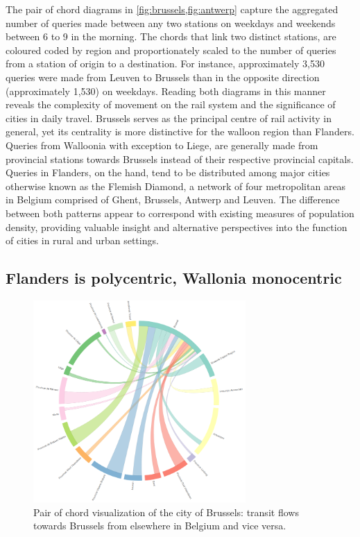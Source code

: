 \documentclass{sig-alternate}
\begin{document}
The pair of chord diagrams in \cref{fig:brussels,fig:antwerp} capture the aggregated number of queries made between any two stations on weekdays and weekends between 6 to 9 in the morning.
The chords that link two distinct stations, are coloured coded by region and proportionately scaled to the number of queries from a station of origin to a destination.
For instance, approximately 3,530 queries were made from Leuven to Brussels than in the opposite direction (approximately 1,530) on weekdays.
Reading both diagrams in this manner reveals the complexity of movement on the rail system and the significance of cities in daily travel.
Brussels serves as the principal centre of rail activity in general, yet its centrality is more distinctive for the walloon region than Flanders.
Queries from Walloonia with exception to Liege, are generally made from provincial stations towards Brussels instead of their respective provincial capitals.
Queries in Flanders, on the hand, tend to be distributed among major cities otherwise known as the Flemish Diamond, a network of four metropolitan areas in Belgium comprised of Ghent, Brussels, Antwerp and Leuven.
The difference between both patterns appear to correspond with existing measures of population density, providing valuable insight and alternative perspectives into the function of cities in rural and urban settings.

\subsection{Flanders is polycentric, Wallonia monocentric}


\begin{figure}
\centering
\includegraphics[width=8.1cm]{brussels}
\caption{Pair of chord visualization of the city of Brussels: transit flows towards Brussels from elsewhere in Belgium and vice versa.}
\label{fig:brussels}
\end{figure}
\end{document}
